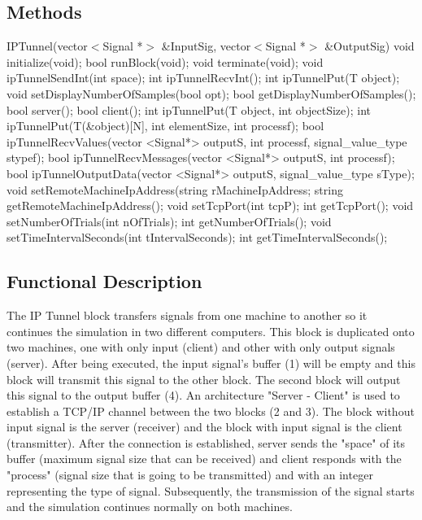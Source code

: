 \subsection*{Methods}
%
IPTunnel(vector$<$Signal *$>$ \&InputSig, vector$<$Signal *$>$ \&OutputSig)
\bigbreak
void initialize(void);
\bigbreak
bool runBlock(void);
\bigbreak
void terminate(void);
\bigbreak
void ipTunnelSendInt(int space);
\bigbreak
int ipTunnelRecvInt();
\bigbreak
int ipTunnelPut(T object);
\bigbreak
void setDisplayNumberOfSamples(bool opt);
\bigbreak
bool getDisplayNumberOfSamples();
\bigbreak
bool server();
\bigbreak
bool client();
\bigbreak
int ipTunnelPut(T object, int objectSize);
\bigbreak
int ipTunnelPut(T(\&object)[N], int elementSize, int processf);
\bigbreak
bool ipTunnelRecvValues(vector <Signal*> outputS, int processf, signal\_value\_type stypef);
\bigbreak
bool ipTunnelRecvMessages(vector <Signal*> outputS, int processf);
\bigbreak
bool ipTunnelOutputData(vector <Signal*> outputS, signal\_value\_type sType);
\bigbreak
void setRemoteMachineIpAddress(string rMachineIpAddress;
\bigbreak
string getRemoteMachineIpAddress();
\bigbreak
void setTcpPort(int tcpP);
\bigbreak
int getTcpPort();
\bigbreak
void setNumberOfTrials(int nOfTrials);
\bigbreak
int getNumberOfTrials();
\bigbreak
void setTimeIntervalSeconds(int tIntervalSeconds);
\bigbreak
int getTimeIntervalSeconds();




\subsection*{Functional Description}

The IP Tunnel block transfers signals from one machine to another so it continues the simulation in two different computers. This block is duplicated onto two machines, one with only input (client) and other with only output signals (server). After being executed, the input signal's buffer (1) will be empty and this block will transmit this signal to the other block. The second block will output this signal to the output buffer (4). An architecture "Server - Client" is used to establish a TCP/IP channel between the two blocks (2 and 3). The block without input signal is the server (receiver) and the block with input signal is the client (transmitter). After the connection is established, server sends the "space" of its buffer (maximum signal size that can be received) and client responds with the "process" (signal size that is going to be transmitted) and with an integer representing the type of signal. Subsequently, the transmission of the signal starts and the simulation continues normally on both machines.

